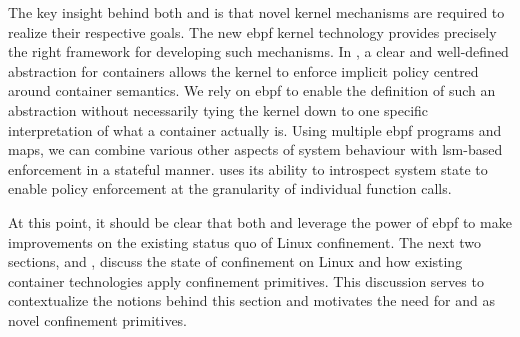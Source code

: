 The key insight behind both \bpfbox{} and \bpfcontain{} is that novel kernel mechanisms
are required to realize their respective goals. The new \gls{ebpf} kernel technology
provides precisely the right framework for developing such mechanisms. In \bpfcontain{},
a clear and well-defined abstraction for containers allows the kernel to enforce implicit
policy centred around container semantics. We rely on \gls{ebpf} to enable the definition
of such an abstraction without necessarily tying the kernel down to one specific
interpretation of what a container actually is. Using multiple \gls{ebpf} programs and
maps, we can combine various other aspects of system behaviour with \gls{lsm}-based
enforcement in a stateful manner. \bpfbox{} uses its ability to introspect system state to
enable policy enforcement at the granularity of individual function calls.

At this point, it should be clear that both \bpfbox{} and \bpfcontain{} leverage the power
of \gls{ebpf} to make improvements on the existing status quo of Linux confinement. The
next two sections,  and , discuss the state of
confinement on Linux and how existing container technologies apply confinement primitives.
This discussion serves to contextualize the notions behind this section and motivates the
need for \bpfbox{} and \bpfcontain{} as novel confinement primitives.

